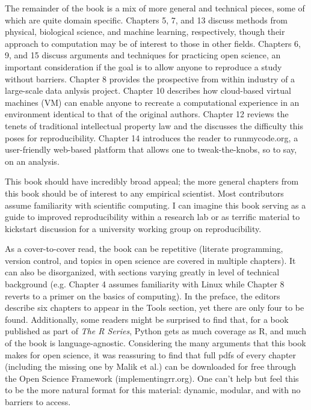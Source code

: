 \documentclass[12pt]{article}
\begin{document}
The remainder of the book is a mix of more general and technical pieces,
some of which are quite domain specific.  Chapters 5, 7, and 13 discuss methods
from physical, biological science, and machine learning, respectively, though
their approach to computation may be of interest to those in other fields. Chapters 
6, 9, and 15 discuss arguments and techniques for practicing open science, an
important consideration if the goal is to allow anyone to reproduce a study
without barriers.  Chapter 8 provides the prospective from within industry of a 
large-scale data anlysis project. Chapter 10 describes how cloud-based virtual 
machines (VM) can enable anyone to recreate a computational experience in an 
environment identical to that of the original authors. Chapter 12 reviews the
tenets of traditional intellectual property law and the discusses the difficulty
 this poses for reproducibility. Chapter 14 introduces the reader to runmycode.org,
a user-friendly web-based platform that allows one to tweak-the-knobs, so to say,
on an analysis.

This book should have incredibly broad appeal; the more general chapters 
from this book should be of interest to any empirical scientist.  Most contributors
assume familiarity with scientific computing. I can imagine this book serving as
a guide to improved reproducibility within a research lab or as terrific  
material to kickstart discussion for a university working group on reproducibility.

As a cover-to-cover read, the book can be repetitive (literate programming, version
control, and topics in open science are covered in multiple chapters).  It can also be
disorganized, with sections varying greatly in level of technical background
(e.g. Chapter 4 assumes familiarity with Linux while Chapter 8 reverts to a primer on
the basics of computing). In the preface, the editors describe six chapters to appear
in the Tools section, yet there are only four to be found. Additionally, some readers might be 
surprised to find that, for a book published as part of \emph{The R Series}, 
Python gets as much coverage as R, and much of the book is language-agnostic.
Considering the many arguments that this book makes for open science, it was
reassuring to find that full pdfs of every chapter (including the missing one by 
Malik et al.) can be downloaded for free through the Open Science Framework 
(implementingrr.org). One can't help but feel this to be the more natural format
 for this material: dynamic, modular, and with no barriers to access.
\end{document}
